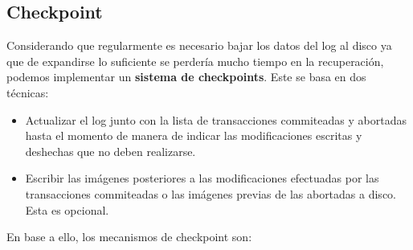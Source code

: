 \subsection*{Checkpoint}
Considerando que regularmente es necesario bajar los datos del log al disco ya que de expandirse lo suficiente se perdería mucho tiempo en la recuperación, podemos implementar un \textbf{sistema de checkpoints}. Este se basa en dos técnicas:
\begin{itemize}
    \item Actualizar el log junto con la lista de transacciones commiteadas y abortadas hasta el momento de manera de indicar las modificaciones escritas y deshechas que no deben realizarse.
    \item Escribir las imágenes posteriores a las modificaciones efectuadas por las transacciones commiteadas o las imágenes previas de las abortadas a disco. Esta es opcional.
\end{itemize}
En base a ello, los mecanismos de checkpoint son:
